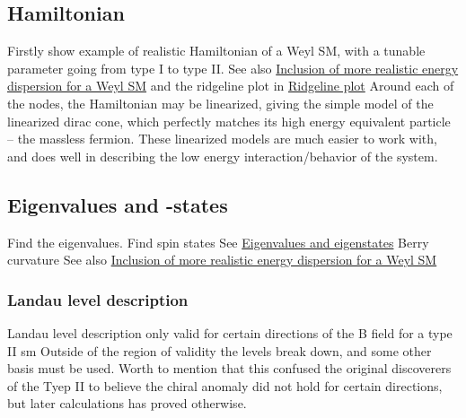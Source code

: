 \documentclass[11pt]{article}
\begin{document}
\subsection{Hamiltonian}
\label{sec:org547238c}
Firstly show example of realistic Hamiltonian of a Weyl SM, with a tunable parameter going from type I to type II.
See also \hyperref[sec:org855f368]{Inclusion of more realistic energy dispersion for a Weyl SM} and the ridgeline plot in \hyperref[sec:orgc5c2be2]{Ridgeline plot}
Around each of the nodes, the Hamiltonian may be linearized, giving the simple model of the linearized dirac cone, which perfectly matches its high energy equivalent particle -- the massless fermion.
These linearized models are much easier to work with, and does well in describing the low energy interaction/behavior of the system.

\subsection{Eigenvalues and -states}
\label{sec:org22909e4}
Find the eigenvalues.
Find spin states
See \hyperref[sec:org6b31ee0]{Eigenvalues and eigenstates}
Berry curvature
See also \hyperref[sec:org855f368]{Inclusion of more realistic energy dispersion for a Weyl SM} 

\subsubsection{Landau level description}
\label{sec:org00cdc6a}
Landau level description only valid for certain directions of the B field for a type II sm
Outside of the region of validity the levels break down, and some other basis must be used.
Worth to mention that this confused the original discoverers of the Tyep II to believe the chiral anomaly did not hold for certain directions, but later calculations has proved otherwise.
\end{document}

